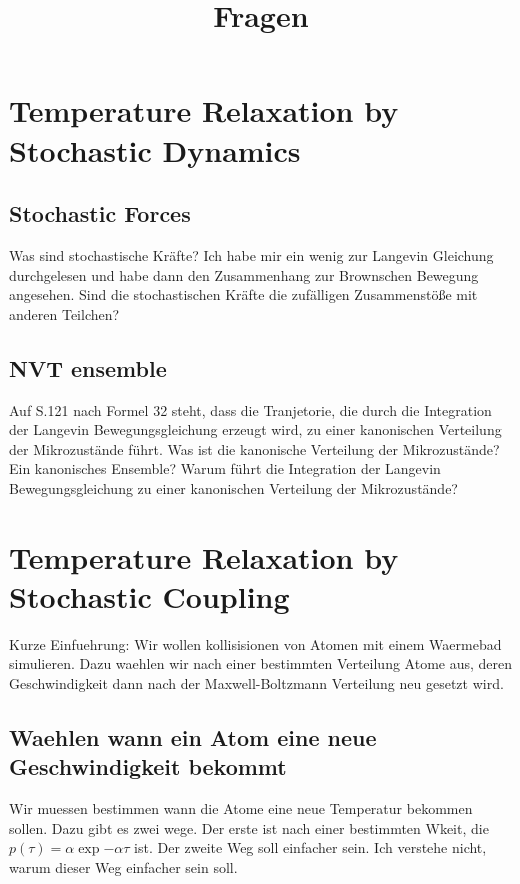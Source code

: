 \documentclass[]{article}
\title{Fragen}
\begin{document}
\maketitle

\section{Temperature Relaxation by Stochastic Dynamics}

\subsection{Stochastic Forces}
Was sind stochastische Kräfte? Ich habe mir ein wenig zur Langevin Gleichung durchgelesen und habe dann den Zusammenhang zur Brownschen Bewegung angesehen. Sind die stochastischen Kräfte die zufälligen Zusammenstöße mit anderen Teilchen? 

\subsection{NVT ensemble}
Auf S.121 nach Formel 32 steht, dass die Tranjetorie, die durch die Integration der Langevin Bewegungsgleichung erzeugt wird, zu einer kanonischen Verteilung der Mikrozustände führt. Was ist die kanonische Verteilung der Mikrozustände? Ein kanonisches Ensemble? Warum führt die Integration der Langevin Bewegungsgleichung zu einer kanonischen Verteilung der Mikrozustände?



\section{Temperature Relaxation by Stochastic Coupling}

Kurze Einfuehrung: Wir wollen kollisisionen von Atomen mit einem Waermebad simulieren.
Dazu waehlen wir nach einer bestimmten Verteilung Atome aus, deren Geschwindigkeit dann nach der Maxwell-Boltzmann Verteilung neu gesetzt wird. 

\subsection{Waehlen wann ein Atom eine neue Geschwindigkeit bekommt}
Wir muessen bestimmen wann die Atome eine neue Temperatur bekommen sollen. Dazu gibt es zwei wege. Der erste ist nach einer bestimmten Wkeit, die $p(\tau)= \alpha \exp{- \alpha \tau}$ ist. Der zweite Weg soll einfacher sein. Ich verstehe nicht, warum dieser Weg einfacher sein soll. 
\end{document}
